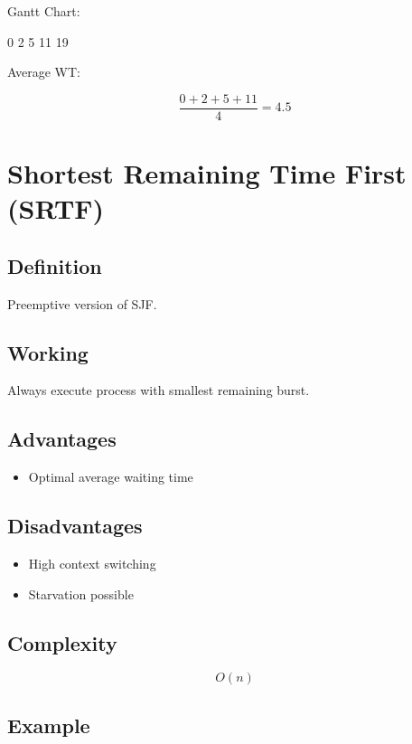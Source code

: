 Gantt Chart:

\begin{center}
0 2 5 11 19
\end{center}

Average WT:

\[
\frac{0+2+5+11}{4}
=4.5
\]

\section{Shortest Remaining Time First (SRTF)}

\subsection{Definition}

Preemptive version of SJF.

\subsection{Working}

Always execute process with smallest remaining burst.

\subsection{Advantages}

\begin{itemize}
\item Optimal average waiting time
\end{itemize}

\subsection{Disadvantages}

\begin{itemize}
\item High context switching
\item Starvation possible
\end{itemize}

\subsection{Complexity}

\[
O(n)
\]

\subsection{Example}

